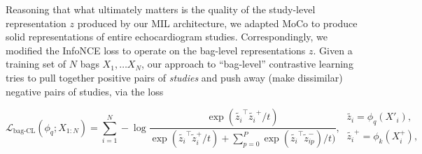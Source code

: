 Reasoning that what ultimately matters is the quality of the study-level representation $z$ produced by our MIL architecture, we adapted MoCo to produce solid representations of entire echocardiogram studies.
Correspondingly, we modified the InfoNCE loss to operate on the bag-level representations $z$. Given a training set of $N$ bags $X_1, \ldots X_N$, our approach to ``bag-level'' contrastive learning tries to pull together positive pairs of \emph{studies} and push away (make dissimilar) negative pairs of studies, via the loss


\begin{equation}
    \label{eq:our InfoNCE}
    \mathcal{L}_{\text{bag-CL}}(\phi_q; X_{1:N}) = \sum_{i=1}^N -\log \frac{\exp(\tilde{z_i}^{\top} \tilde{z_i}^{+}/t)}{\exp(\tilde{z_i}^{\top} \tilde{z}_i^{+}/t) + \sum_{p=0}^P \exp(\tilde{z_i}^{\top} \tilde{z}_{ip}^{-})/t)}, 
    ~
    \begin{array}{cc}
         \tilde{z_i} = \phi_q(X'_i),
         \\
         \tilde{z_i}^{+} = \phi_k(X^{+}_i),
    \end{array}
\end{equation} 

